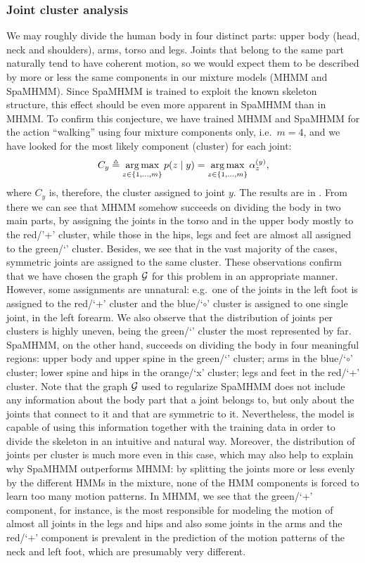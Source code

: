 \subsubsection{Joint cluster analysis}
\label{sec:spamhmm_cluster}
We may roughly divide the human body in four distinct parts: upper body (head, neck and shoulders), arms, torso and legs. Joints that belong to the same part naturally tend to have coherent motion, so we would expect them to be described by more or less the same components in our mixture models (MHMM and SpaMHMM). Since SpaMHMM is trained to exploit the known skeleton structure, this effect should be even more apparent in SpaMHMM than in MHMM. To confirm this conjecture, we have trained MHMM and SpaMHMM for the action ``walking'' using four mixture components only, i.e.\ $m=4$, and we have looked for the most likely component (cluster) for each joint:
\begin{equation}
    C_y \triangleq \operatorname*{arg\,max}_{z \in \{1,\dots,m\}} p(z \mid y) = \operatorname*{arg\,max}_{z \in \{1,\dots,m\}} {\alpha}^{(y)}_z,
\end{equation}
where $C_y$ is, therefore, the cluster assigned to joint $y$. The results are in . From there we can see that MHMM somehow succeeds on dividing the body in two main parts, by assigning the joints in the torso and in the upper body mostly to the red/'+' cluster, while those in the hips, legs and feet are almost all assigned to the green/`\SmallTriangleUp' cluster. Besides, we see that in the vast majority of the cases, symmetric joints are assigned to the same cluster. These observations confirm that we have chosen the graph ${\mathcal{G}}$ for this problem in an appropriate manner. However, some assignments are unnatural: e.g.\  one of the joints in the left foot is assigned to the red/`+' cluster and the blue/`$\circ$' cluster is assigned to one single joint, in the left forearm. We also observe that the distribution of joints per clusters is highly uneven, being the green/`\SmallTriangleUp' cluster the most represented by far. SpaMHMM, on the other hand, succeeds on dividing the body in four meaningful regions: upper body and upper spine in the green/`\SmallTriangleUp' cluster; arms in the blue/`$\circ$' cluster; lower spine and hips in the orange/`x' cluster; legs and feet in the red/`+' cluster. Note that the graph ${\mathcal{G}}$ used to regularize SpaMHMM does not include any information about the body part that a joint belongs to, but only about the joints that connect to it and that are symmetric to it. Nevertheless, the model is capable of using this information together with the training data in order to divide the skeleton in an intuitive and natural way. Moreover, the distribution of joints per cluster is much more even in this case, which may also help to explain why SpaMHMM outperforms MHMM: by splitting the joints more or less evenly by the different HMMs in the mixture, none of the HMM components is forced to learn too many motion patterns. In MHMM, we see that the green/`+' component, for instance, is the most responsible for modeling the motion of almost all joints in the legs and hips and also some joints in the arms and the red/`+' component is prevalent in the prediction of the motion patterns of the neck and left foot, which are presumably very different.

